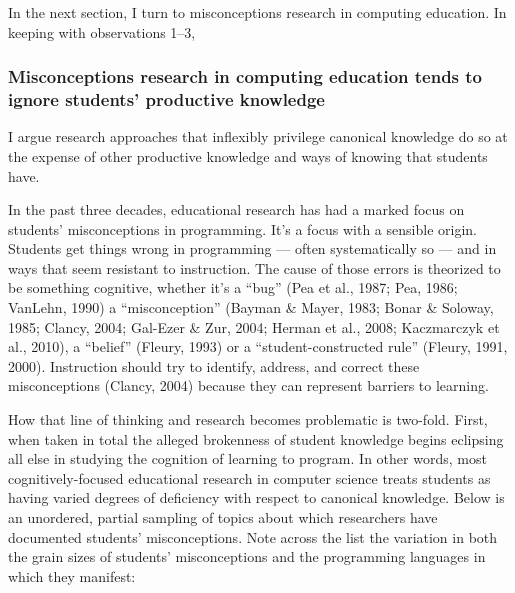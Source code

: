 In the next section, I turn to misconceptions research in computing
education. In keeping with observations 1--3,

\subsubsection{Misconceptions research in computing education tends to
ignore students' productive
knowledge}\label{misconceptions-research-in-computing-education-tends-to-ignore-students-productive-knowledge}

I argue research
approaches that inflexibly privilege canonical knowledge do so at the
expense of other productive knowledge and ways of knowing that students
have.

In the past three decades, educational research has had a marked focus
on students' misconceptions in programming. It's a focus with a sensible
origin. Students get things wrong in programming --- often
systematically so --- and in ways that seem resistant to instruction.
The cause of those errors is theorized to be something cognitive,
whether it's a ``bug'' (Pea et al., 1987; Pea, 1986; VanLehn, 1990) a
``misconception'' (Bayman \& Mayer, 1983; Bonar \& Soloway, 1985;
Clancy, 2004; Gal-Ezer \& Zur, 2004; Herman et al., 2008; Kaczmarczyk et
al., 2010), a ``belief'' (Fleury, 1993) or a ``student-constructed
rule'' (Fleury, 1991, 2000). Instruction should try to identify,
address, and correct these misconceptions (Clancy, 2004) because they
can represent barriers to learning.

How that line of thinking and research becomes problematic is two-fold.
First, when taken in total the alleged brokenness of student knowledge
begins eclipsing all else in studying the cognition of learning to
program. In other words, most cognitively-focused educational research
in computer science treats students as having varied degrees of
deficiency with respect to canonical knowledge. Below is an unordered,
partial sampling of topics about which researchers have documented
students' misconceptions. Note across the list the variation in both the
grain sizes of students' misconceptions and the programming languages in
which they manifest:

